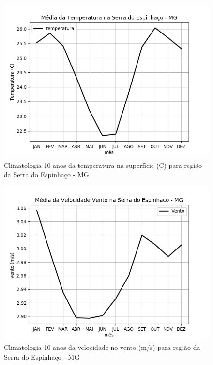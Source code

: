 \documentclass[conference]{IEEEtran}
\begin{document}
\begin{figure}[htbp]
\centerline{\includegraphics[width=0.4\paperwidth]{figuras/temp.png}}
\caption{Climatologia 10 anos da temperatura na superfície (C) para região da Serra do Espinhaço - MG}
\label{inputTemp}
\end{figure}


\begin{figure}[htbp]
\centerline{\includegraphics[width=0.4\paperwidth]{figuras/vento.png}}
\caption{Climatologia 10 anos da velocidade no vento (m/s) para região da Serra do Espinhaço - MG}
\label{inputVento}
\end{figure}
\end{document}
